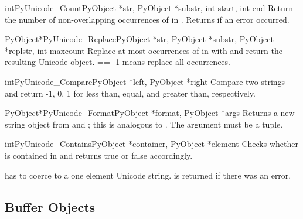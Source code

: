 \begin{cfuncdesc}{int}{PyUnicode_Count}{PyObject *str,
                                        PyObject *substr,
                                        int start,
                                        int end}
  Return the number of non-overlapping occurrences of  in
  .  Returns  if an
  error occurred.
\end{cfuncdesc}

\begin{cfuncdesc}{PyObject*}{PyUnicode_Replace}{PyObject *str,
                                                PyObject *substr,
                                                PyObject *replstr,
                                                int maxcount}
  Replace at most  occurrences of  in
   with  and return the resulting Unicode object.
   == -1 means replace all occurrences.
\end{cfuncdesc}

\begin{cfuncdesc}{int}{PyUnicode_Compare}{PyObject *left, PyObject *right}
  Compare two strings and return -1, 0, 1 for less than, equal, and
  greater than, respectively.
\end{cfuncdesc}

\begin{cfuncdesc}{PyObject*}{PyUnicode_Format}{PyObject *format,
                                              PyObject *args}
  Returns a new string object from  and ; this
  is analogous to .  The
   argument must be a tuple.
\end{cfuncdesc}

\begin{cfuncdesc}{int}{PyUnicode_Contains}{PyObject *container,
                                           PyObject *element}
  Checks whether  is contained in  and
  returns true or false accordingly.

   has to coerce to a one element Unicode
  string.  is returned if there was an error.
\end{cfuncdesc}


\subsection{Buffer Objects \label{bufferObjects}}

